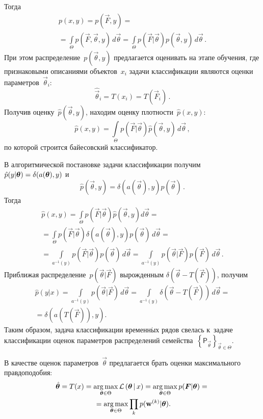 \begin{multicols}{2}
\smallskip
Тогда
\begin{multline*}
p(x,y)=
p(\vec{F},y)={}\\
{}=
\int\limits_{\Theta}p(\vec{F},\vec\theta,y)\,d\vec\theta=
\int\limits_{\Theta}p(\vec{F}|\vec\theta)p(\vec\theta,y)\,d\vec\theta\,.
\end{multline*}
При этом распределение~$p(\vec\theta,y)$ предлагается оценивать на этапе 
обучения, где признаковыми описаниями объектов~$x_i$ задачи классификации являются 
оценки параметров~$\vec\theta_i$:
$$
\hat{\vec\theta}_i=T(x_i)=T(\vec{F}_i)\,.
$$
Получив оценку~$\hat{p}(\vec\theta,y)$, находим оценку плот\-ности~$\hat{p}(x,y)$:
$$
\hat{p}(x,y)=
\int\limits_{\Theta}p(\vec{F}|\vec\theta)\hat{p}(\vec\theta,y)\,d\vec\theta\,,
$$
по которой строится байесовский классификатор.

\pagebreak

В алгоритмической постановке задачи классификации получим~$\hat{p}(y|\vec\theta)
\hm=\delta(a(\vec\theta),y)$ и
$$
\hat{p}(\vec\theta,y)=\delta(a(\vec\theta),y)p(\vec\theta)\,.
$$
Тогда
\begin{multline*}
\hat{p}(x,y)=
\int\limits_{\Theta}\!p\left(\vec{F}|\vec\theta\right)\hat{p}
(\vec\theta,y)d\vec\theta={}\\
{}=
\int\limits_{\Theta}\!p\left(\vec{F}|\vec\theta\right)\delta\left(a\left(\vec\theta\right),y\right)
p\left(\vec\theta\right)\,d\vec\theta={}\\
{}=\int\limits_{a^{-1}(y)}\!p\left(\vec{F}|\vec\theta\right)p\left(\vec\theta\right)\,d\vec\theta=
\int\limits_{a^{-1}(y)}\!p\left(\vec\theta|\vec{F}\right)p\left(\vec{F}\right)\,d\vec\theta\,.
\end{multline*}
Приближая распределение~$p(\vec\theta|\vec{F})$ вырожденным 
$\delta(\vec\theta-T(\vec{F}))$, получим
\begin{multline*}
\hat{p}(y|x)=
\!\int\limits_{a^{-1}(y)}\!\!\! \!p\left(\vec\theta|\vec{F}\right)\,d\vec\theta=
\!\int\limits_{a^{-1}(y)}\!\!\!\!\delta\left(\vec\theta-T\left(\vec{F}\right)\right)\,
d\vec\theta={}\\
{}=
\delta\left(a(T(\vec{F})),y\right).
\end{multline*}
Таким образом, задача классификации временн$\acute{\mbox{ы}}$х рядов свелась к~задаче 
классификации оценок параметров распределений 
семейства~$\left\{\mathsf{P}_{\vec\theta}\right\}_{\vec\theta\in \Theta}$.

В качестве оценок параметров~$\vec\theta$ предлагается брать оценки максимального 
правдоподобия:
\begin{multline*}
\hat{\boldsymbol{\theta}}=
T(x)=
\mathop{\mathrm{arg}\,\mathrm{max}}_{\boldsymbol{\theta}\in\Theta}\mathcal{L}\left(\boldsymbol{\theta}\,|\,x\right)=
\mathop{\mathrm{arg}\,\mathrm{max}}_{\boldsymbol{\theta}\in\Theta}p(\boldsymbol{F}|\boldsymbol{\theta})={}\\
{}=
\mathop{\mathrm{arg}\,\mathrm{max}}_{\boldsymbol{\theta}\in\Theta}\prod_{k}p(\mathbf{w}^{(k)}|\boldsymbol{\theta}).
\end{multline*}


\end{multicols}
